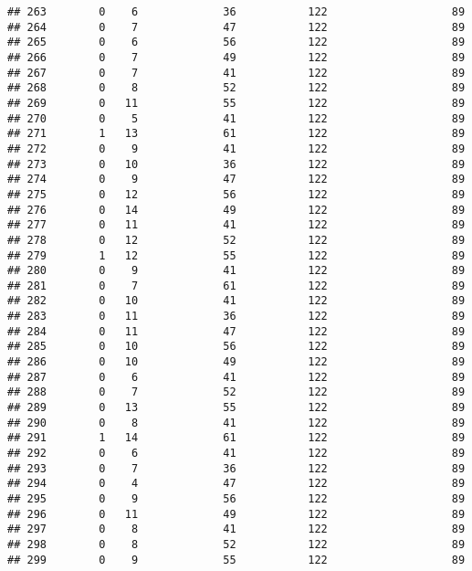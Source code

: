 \documentclass[]{article}
\begin{document}
\begin{verbatim}
## 263        0    6             36           122                   89
## 264        0    7             47           122                   89
## 265        0    6             56           122                   89
## 266        0    7             49           122                   89
## 267        0    7             41           122                   89
## 268        0    8             52           122                   89
## 269        0   11             55           122                   89
## 270        0    5             41           122                   89
## 271        1   13             61           122                   89
## 272        0    9             41           122                   89
## 273        0   10             36           122                   89
## 274        0    9             47           122                   89
## 275        0   12             56           122                   89
## 276        0   14             49           122                   89
## 277        0   11             41           122                   89
## 278        0   12             52           122                   89
## 279        1   12             55           122                   89
## 280        0    9             41           122                   89
## 281        0    7             61           122                   89
## 282        0   10             41           122                   89
## 283        0   11             36           122                   89
## 284        0   11             47           122                   89
## 285        0   10             56           122                   89
## 286        0   10             49           122                   89
## 287        0    6             41           122                   89
## 288        0    7             52           122                   89
## 289        0   13             55           122                   89
## 290        0    8             41           122                   89
## 291        1   14             61           122                   89
## 292        0    6             41           122                   89
## 293        0    7             36           122                   89
## 294        0    4             47           122                   89
## 295        0    9             56           122                   89
## 296        0   11             49           122                   89
## 297        0    8             41           122                   89
## 298        0    8             52           122                   89
## 299        0    9             55           122                   89

\end{verbatim}
\end{document}
